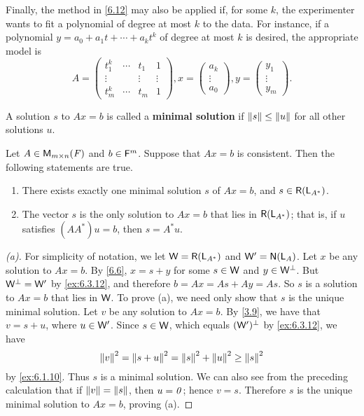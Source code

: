 \begin{note}
	Finally, the method in \cref{6.12} may also be applied if, for some \(k\), the experimenter wants to fit a polynomial of degree at most \(k\) to the data.
	For instance, if a polynomial \(y = a_0 + a_1 t + \cdots + a_k t^k\) of degree at most \(k\) is desired, the appropriate model is
	\[
		A = \begin{pmatrix}
			t_1^k  & \cdots & t_1    & 1      \\
			\vdots &        & \vdots & \vdots \\
			t_m^k  & \cdots & t_m    & 1
		\end{pmatrix}, x = \begin{pmatrix}
			a_k    \\
			\vdots \\
			a_0
		\end{pmatrix}, y = \begin{pmatrix}
			y_1    \\
			\vdots \\
			y_m
		\end{pmatrix}.
	\]
\end{note}

\begin{defn}\label{6.3.7}
	A solution \(s\) to \(Ax = b\) is called a \textbf{minimal solution} if \(\left\lVert s\right\rVert \leq \left\lVert u\right\rVert\) for all other solutions \(u\).
\end{defn}

\begin{thm}\label{6.13}
	Let \(A \in \ms\) and \(b \in \mathsf{F}^m\).
	Suppose that \(Ax = b\) is consistent.
	Then the following statements are true.
	\begin{enumerate}
		\item There exists exactly one minimal solution \(s\) of \(Ax = b\), and \(s \in \rg{\L_{A^*}}\).
		\item The vector \(s\) is the only solution to \(Ax = b\) that lies in \(\rg{\L_{A^*}}\);
		      that is, if \(u\) satisfies \((A A^*) u = b\), then \(s = A^* u\).
	\end{enumerate}
\end{thm}

\begin{proof}[(a)]
	For simplicity of notation, we let \(\W = \rg{\L_{A^*}}\) and \(\W' = \ns{\L_A}\).
	Let \(x\) be any solution to \(Ax = b\).
	By \cref{6.6}, \(x = s + y\) for some \(s \in \mathsf{W}\) and \(y \in \mathsf{W}^{\perp}\).
	But \(\mathsf{W}^{\perp} = \mathsf{W}'\) by \cref{ex:6.3.12}, and therefore \(b = Ax = As + Ay = As\).
	So \(s\) is a solution to \(Ax = b\) that lies in \(\mathsf{W}\).
	To prove (a), we need only show that \(s\) is the unique minimal solution.
	Let \(v\) be any solution to \(Ax = b\).
	By \cref{3.9}, we have that \(v = s + u\), where \(u \in \mathsf{W}'\).
	Since \(s \in \mathsf{W}\), which equals \((\mathsf{W}')^{\perp}\) by \cref{ex:6.3.12}, we have
	\[
		\left\lVert v\right\rVert^2 = \left\lVert s + u\right\rVert^2 = \left\lVert s\right\rVert^2 + \left\lVert u\right\rVert^2 \geq \left\lVert s\right\rVert^2
	\]
	by \cref{ex:6.1.10}.
	Thus \(s\) is a minimal solution.
	We can also see from the preceding calculation that if \(\left\lVert v\right\rVert = \left\lVert s\right\rVert\), then \(u = \mathit{0}\);
	hence \(v = s\).
	Therefore \(s\) is the unique minimal solution to \(Ax = b\), proving (a).
\end{proof}

